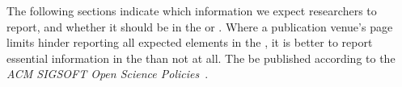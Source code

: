 The following sections indicate which information we expect researchers to report, and whether it should be in the \paper or \supplementarymaterial. Where a publication venue's page limits hinder reporting all expected elements in the \paper, it is better to report essential information in the \supplementarymaterial than not at all.
The \supplementarymaterial \should be published according to the \emph{ACM SIGSOFT Open Science Policies}~\citep{daniel_graziotin_2024_10796477}.
